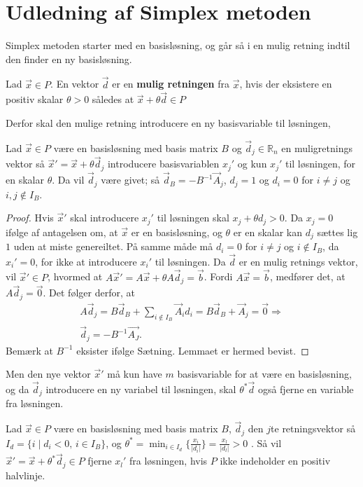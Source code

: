 \section{Udledning af Simplex metoden}
Simplex metoden starter med en basisløsning, og går så i en mulig retning indtil den finder en ny basisløsning.
\begin{defn}
Lad $\vec{x} \in P$. En vektor $\vec{d}$ er en \textbf{mulig retningen} fra $\vec{x}$, hvis der eksistere en positiv skalar $\theta > 0$ således at $\vec{x}+\theta\vec{d} \in P$ 
\end{defn}
Derfor skal den mulige retning introducere en ny basisvariable til løsningen,
\begin{lma}
Lad $\vec{x} \in P$ være en basisløsning med basis matrix $B$ og $\vec{d}_j  \in \mathds{R}_n$ en muligretnings vektor så $\vec{x}' = \vec{x}+ \theta\vec{d}_j$ introducere basisvariablen $x_j'$ og kun $x_j'$ til løsningen, for en skalar $\theta$.
Da vil $\vec{d}_j$ være givet; så $\vec{d}_B = -B^{-1}\vec{A}_j$, $d_j = 1$ og $d_i = 0$ for $i \neq j$ og $ i,j \notin I_B$.
\label{lma:retningsvektor}
\end{lma}
\begin{proof}
Hvis $\vec{x}'$ skal introducere $x_j'$ til løsningen skal $x_j + \theta d_j > 0$. 
Da $x_j = 0$ ifølge af antagelsen om, at $\vec{x}$ er en basisløsning, og $\theta$ er en skalar kan $d_j$ sættes lig $1$ uden at miste genereiltet. 
På samme måde må $d_i = 0$ for $i \neq j$ og $i \notin I_B$, da $x_i' = 0$, for ikke at introducere $x_i'$ til løsningen.
Da $\vec{d}$ er en mulig retnings vektor, vil $\vec{x}' \in P$, hvormed at $A\vec{x}' = A\vec{x}+ \theta A\vec{d}_j = \vec{b}$. 
Fordi $A\vec{x} = \vec{b}$, medfører det, at $A\vec{d}_j = \vec{0}$.
Det følger derfor, at
\begin{align*}
A\vec{d}_j = B \vec{d}_B + \sum_{i \notin I_B} \vec{A}_id_i = B\vec{d}_B + \vec{A}_j = \vec{0} \Rightarrow
\\ \vec{d}_j = -B^{-1}\vec{A_J}.
\end{align*}
Bemærk at $B^{-1}$ eksister ifølge Sætning. 
Lemmaet er hermed bevist.
\end{proof}
Men den nye vektor $\vec{x}'$ må kun have $m$ basisvariable for at være en basisløsning, og da $\vec{d}_j$ introducere en ny variabel til løsningen, skal $\theta^*\vec{d}$ også fjerne en variable fra  løsningen.
\begin{lma}
Lad $\vec{x} \in P$ være en basisløsning med basis matrix $B$, $\vec{d}_j$ den $j$te retningsvektor så $I_d = \{i \mid d_i < 0, \, i  \in I_B\}$, og $\theta^* = \min_{i \in I_d}\{\frac{x_i}{|d_i|}\}=\frac{x_l}{|d_l|} > 0$ . 
Så vil $\vec{x}' = \vec{x}+ \theta^* \vec{d}_j \in P$ fjerne $x_l'$ fra løsningen, hvis $P$ ikke indeholder en positiv halvlinje.
\label{lma:skalar}
\end{lma}
